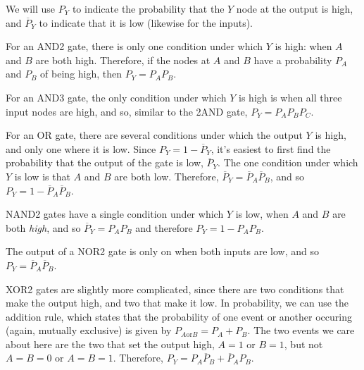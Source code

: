\documentclass{article}
\begin{document}
\begin{enumerate}[label=\thesubsection]
		We will use \(P_Y\) to indicate the probability that the \(Y\) node at the output is high, and \(\overline{P}_Y\) to indicate that it is low (likewise for the inputs).

		For an AND2 gate, there is only one condition under which \(Y\) is high: when \(A\) and \(B\) are both high. Therefore, if the nodes at \(A\) and \(B\) have a probability \(P_A\) and \(P_B\) of being high, then \(P_Y = P_AP_B\).

		For an AND3 gate, the only condition under which \(Y\) is high is when all three input nodes are high, and so, similar to the 2AND gate, \(P_Y = P_AP_BP_C\).

		For an OR gate, there are several conditions under which the output \(Y\) is high, and only one where it is low. Since \(P_Y = 1-\overline{P}_Y\), it's easiest to first find the probability that the output of the gate is low, \(\overline{P}_Y\). The one condition under which \(Y\) is low is that \(A\) and \(B\) are both low. Therefore, \(\overline{P}_Y = \overline{P}_A\overline{P}_B\), and so \(P_Y = 1 - \overline{P}_A\overline{P}_B\). 

		NAND2 gates have a single condition under which \(Y\) is low, when \(A\) and \(B\) are both \textit{high}, and so \(\overline{P}_Y = P_AP_B\) and therefore \(P_Y = 1-P_AP_B\). 

		The output of a NOR2 gate is only on when both inputs are low, and so \(P_Y = \overline{P}_A\overline{P}_B\). 

		XOR2 gates are slightly more complicated, since there are two conditions that make the output high, and two that make it low. In probability, we can use the addition rule, which states that the probability of one event or another occuring (again, mutually exclusive) is given by \(P_{A \mathrm{or} B} = P_A + P_B\). The two events we care about here are the two that set the output high, \(A = 1\) or \(B = 1\), but not \(A = B = 0\) or \(A = B = 1\). Therefore, \(P_Y = P_A\overline{P}_B + \overline{P}_AP_B\).

\end{enumerate}
\end{document}
